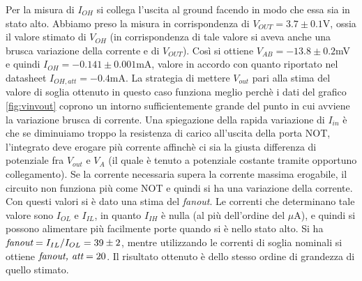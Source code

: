 \documentclass[10pt,a4paper]{article}
\begin{document}
Per la misura di $I_{OH}$ si collega l'uscita al ground facendo in modo che essa sia in stato alto.
Abbiamo preso la misura in corrispondenza di $V_{OUT}=3.7\pm0.1 $V, ossia il valore stimato di $V_{OH}$ (in corrispondenza di tale valore si aveva anche una brusca variazione della corrente e di $V_{OUT}$).
Così si ottiene $V_{AB}=-13.8\pm0.2$mV e quindi $I_{OH}=-0.141\pm0.001$mA, valore in accordo con quanto riportato nel datasheet $I_{OH,att}=-0.4$mA. La strategia di mettere $V_{out}$ pari alla stima del valore di soglia ottenuto in questo caso funziona meglio perchè i dati del grafico \ref{fig:vinvout} coprono un intorno sufficientemente grande del punto in cui avviene la variazione brusca di corrente.
Una spiegazione della rapida variazione di $I_{in}$ è che se diminuiamo troppo la resistenza di carico all'uscita della porta NOT, l'integrato deve erogare più corrente affinchè ci sia la giusta differenza di potenziale fra $V_{out}$ e $V_{A}$ (il quale è tenuto a potenziale costante tramite opportuno collegamento). Se la corrente necessaria supera la corrente massima erogabile, il circuito non funziona più come NOT e quindi si ha una variazione della corrente.  
Con questi valori si è dato una stima del \emph{fanout}.
Le correnti che determinano tale valore sono $I_{OL}$ e $I_{IL}$, in quanto $I_{IH}$ è nulla (al più dell'ordine del $\mu$A), e quindi si possono alimentare più facilmente porte quando si è nello stato alto.
Si ha $\emph{fanout}= I_{IL}/I_{OL}=39\pm 2$, mentre utilizzando le correnti di soglia nominali si ottiene $\emph{fanout, att}=20$. Il risultato ottenuto è dello stesso ordine di grandezza di quello stimato.
\end{document}

